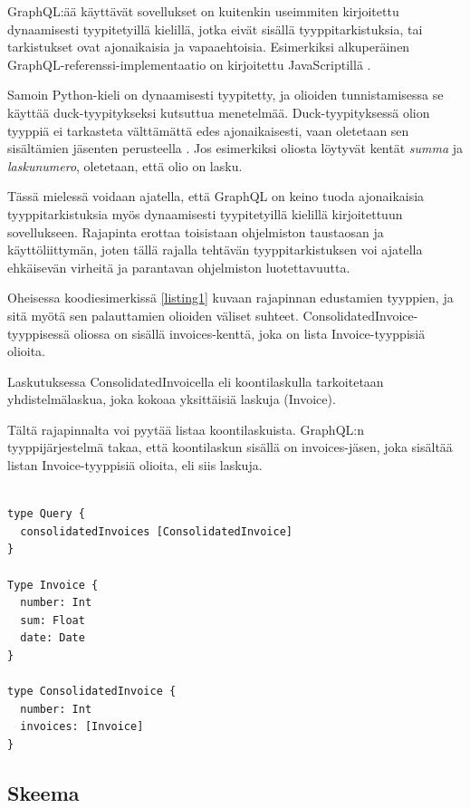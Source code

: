 GraphQL:ää käyttävät sovellukset on kuitenkin useimmiten kirjoitettu
dynaamisesti tyypitetyillä kielillä, jotka eivät sisällä
tyyppitarkistuksia, tai tarkistukset ovat ajonaikaisia ja vapaaehtoisia.
Esimerkiksi alkuperäinen GraphQL-referenssi-implementaatio on
kirjoitettu JavaScriptillä \citep{graphqlRefImple2021Oct}.

Samoin Python-kieli on dynaamisesti tyypitetty, ja olioiden
tunnistamisessa se käyttää duck-tyypitykseksi kutsuttua menetelmää.
Duck-tyypityksessä olion tyyppiä ei tarkasteta välttämättä edes
ajonaikaisesti, vaan oletetaan sen sisältämien jäsenten perusteella
\cite{pythonGloss2021Oct}. Jos esimerkiksi oliosta löytyvät kentät
\emph{summa} ja \emph{laskunumero}, oletetaan, että olio on lasku.

Tässä mielessä voidaan ajatella, että GraphQL on keino tuoda
ajonaikaisia tyyppitarkistuksia myös dynaamisesti tyypitetyillä kielillä
kirjoitettuun sovellukseen. Rajapinta erottaa toisistaan ohjelmiston
taustaosan ja käyttöliittymän, joten tällä rajalla tehtävän
tyyppitarkistuksen voi ajatella ehkäisevän virheitä ja parantavan
ohjelmiston luotettavuutta.

Oheisessa koodiesimerkissä \ref{listing1} kuvaan rajapinnan edustamien
tyyppien, ja sitä myötä sen palauttamien olioiden väliset suhteet.
ConsolidatedInvoice-tyyppisessä oliossa on sisällä invoices-kenttä, joka
on lista Invoice-tyyppisiä olioita.

Laskutuksessa ConsolidatedInvoicella eli koontilaskulla tarkoitetaan
yhdistelmälaskua, joka kokoaa yksittäisiä laskuja (Invoice).

Tältä rajapinnalta voi pyytää listaa koontilaskuista. GraphQL:n
tyyppijärjestelmä takaa, että koontilaskun sisällä on invoices-jäsen,
joka sisältää listan Invoice-tyyppisiä olioita, eli siis laskuja.

\begin{code}
  \begin{verbatim}

type Query {
  consolidatedInvoices [ConsolidatedInvoice]
}

Type Invoice {
  number: Int
  sum: Float
  date: Date
}

type ConsolidatedInvoice {
  number: Int
  invoices: [Invoice]
}
  \end{verbatim}
  \label{listing1}
\end{code}

\hypertarget{skeema}{%
\subsection{Skeema}\label{skeema}}

